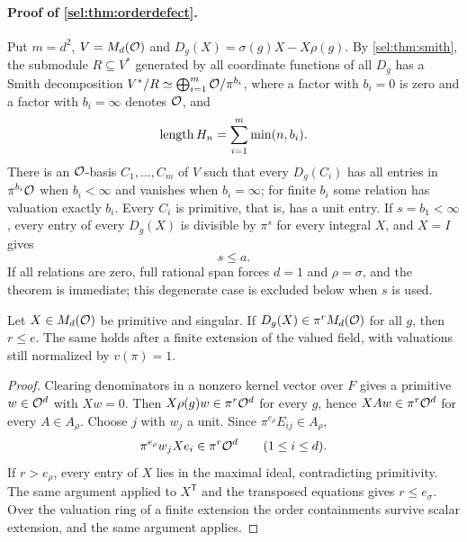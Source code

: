 \paragraph{Proof of \cref{sel:thm:orderdefect}.}
Put $m=d^2$, $V=M_d(\mathcal{O})$ and $D_g(X)=\sigma(g)X-X\rho(g)$. By
\cref{sel:thm:smith}, the submodule $R\subseteq V^*$ generated by all
coordinate functions of all $D_g$ has a Smith decomposition
$V^*/R\simeq\bigoplus_{i=1}^m\mathcal{O}/\pi^{b_i}$, where a factor with $b_i=0$ is
zero and a factor with $b_i=\infty$ denotes $\mathcal{O}$, and
\begin{equation}\label{sel:eq:odlength}
 \operatorname{length} H_n=\sum_{i=1}^m\min(n,b_i).
\end{equation}
There is an $\mathcal{O}$-basis $C_1,\dots,C_m$ of $V$ such that every $D_g(C_i)$
has all entries in $\pi^{b_i}\mathcal{O}$ when $b_i<\infty$ and vanishes when
$b_i=\infty$; for finite $b_i$ some relation has valuation exactly $b_i$.
Every $C_i$ is primitive, that is, has a unit entry. If $s=b_1<\infty$, every
entry of every $D_g(X)$ is divisible by $\pi^s$ for every integral $X$, and
$X=I$ gives
\begin{equation}\label{sel:eq:odmintrace}
 s\le a.
\end{equation}
If all relations are zero, full rational span forces $d=1$ and $\rho=\sigma$,
and the theorem is immediate; this degenerate case is excluded below when
$s$ is used.

\begin{lemma}\label{sel:lem:singular}
Let $X\in M_d(\mathcal{O})$ be primitive and singular. If
$D_g(X)\in\pi^rM_d(\mathcal{O})$ for all $g$, then $r\le e$. The same holds after a
finite extension of the valued field, with valuations still normalized by
$v(\pi)=1$.
\end{lemma}

\begin{proof}
Clearing denominators in a nonzero kernel vector over $F$ gives a primitive
$w\in\mathcal{O}^d$ with $Xw=0$. Then $X\rho(g)w\in\pi^r\mathcal{O}^d$ for every $g$, hence
$XAw\in\pi^r\mathcal{O}^d$ for every $A\in A_\rho$. Choose $j$ with $w_j$ a unit.
Since $\pi^{e_\rho}E_{ij}\in A_\rho$,
\[
 \pi^{e_\rho}w_jXe_i\in\pi^r\mathcal{O}^d\qquad(1\le i\le d).
\]
If $r>e_\rho$, every entry of $X$ lies in the maximal ideal, contradicting
primitivity. The same argument applied to $X^{\mathsf T}$ and the transposed
equations gives $r\le e_\sigma$. Over the valuation ring of a finite
extension the order containments survive scalar extension, and the same
argument applies.
\end{proof}

